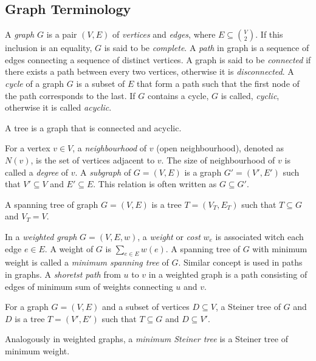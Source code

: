 
\subsection{Graph Terminology}

A \emph{graph} $G$ is a pair $(V,E)$ of \emph{vertices} and \emph{edges}, where $E\subseteq {{V}\choose{2}}$.
If this inclusion is an equality, $G$ is said to be \emph{complete}.
A \emph{path} in graph is a sequence of edges connecting a sequence of distinct vertices.
A graph is said to be \emph{connected} if there exists a path between every two vertices, otherwise it is \emph{disconnected}.
A \emph{cycle} of a graph $G$ is a subset of $E$ that form a path such that the first node of the path corresponds to the last. 
If $G$ contains a cycle, $G$ is called, \emph{cyclic}, otherwise it is called \emph{acyclic}.
\begin{definition}
A tree is a graph that is connected and acyclic.
\end{definition}
For a vertex $v\in V$, a \emph{neighbourhood} of $v$ (open neighbourhood), denoted as $N(v)$, is the set of vertices adjacent to $v$.
The size of neighbourhood of $v$ is called a \emph{degree} of $v$.
A \emph{subgraph} of $G=(V,E)$ is a graph $G'=(V',E')$ such that $V'\subseteq V$ and $E'\subseteq E$.
This relation is often written as $G\subseteq G'$.
\begin{definition}
A spanning tree of graph $G=(V,E)$ is a tree $T=(V_T,E_T)$ such that $T\subseteq G$ and $V_T=V$.
\end{definition}

In a \emph{weighted graph} $G=(V,E,w)$, a \emph{weight} or \emph{cost} $w_e$ is associated witch each edge $e\in E$.
A weight of $G$ is $\sum_{e\in E}w(e)$.
A spanning tree of $G$ with minimum weight is called a \emph{minimum spanning tree} of $G$.
Similar concept is used in paths in graphs.
A \emph{shoretst path} from $u$ to $v$ in a weighted graph is a path consisting of edges of minimum sum of weights connecting $u$ and $v$.
\begin{definition}
	For a graph $G=(V,E)$ and a subset of vertices $D\subseteq V$, a Steiner tree of $G$ and $D$ is a tree $T=(V',E')$ such that $T\subseteq G$ and $D\subseteq V'$.
\end{definition}
Analogously in weighted graphs, a \emph{minimum Steiner tree} is a Steiner tree of minimum weight.

